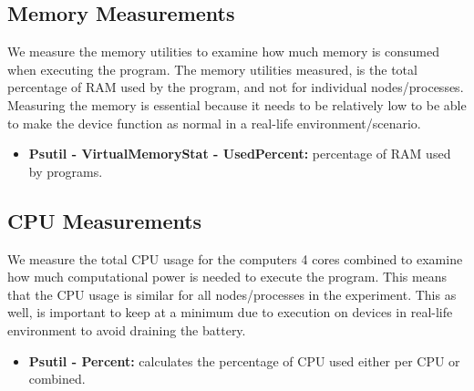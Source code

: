 \documentclass[USenglish]{uit-thesis}
\begin{document}


\subsection{Memory Measurements} \label{eva:mem_measure}
We measure the memory utilities to examine how much memory is consumed when executing the program. The memory utilities measured, is the total percentage of RAM used by the program, and not for individual nodes/processes.
Measuring the memory is essential because it needs to be relatively low to be able to make the device function as normal in a real-life environment/scenario.

\begin{itemize}
\item \textbf{Psutil - VirtualMemoryStat - UsedPercent:} percentage of RAM used by programs.
\end{itemize}



\subsection{CPU Measurements} \label{eva:cpu_measure}
We measure the total CPU usage for the computers 4 cores combined to examine how much computational power is needed to execute the program. This means that the CPU usage is similar for all nodes/processes in the experiment.
This as well, is important to keep at a minimum due to execution on devices in real-life environment to avoid draining the battery.


\begin{itemize}
\item \textbf{Psutil - Percent:} calculates the percentage of CPU used either per CPU or combined.
\end{itemize}
\end{document}
